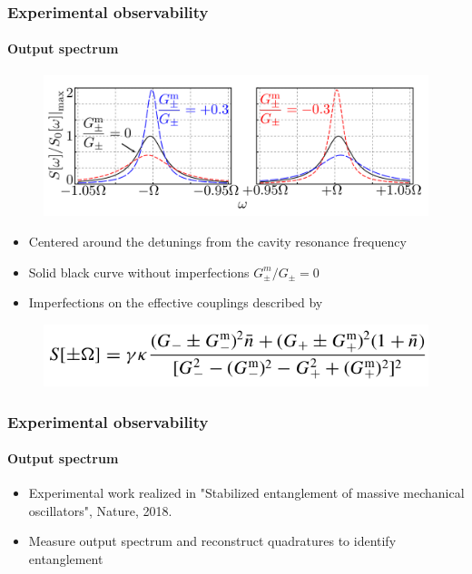 \documentclass[aspectratio=43]{beamer}
\begin{document}
\begin{frame}

\frametitle{Experimental observability}
\framesubtitle{Output spectrum}
	
	\begin{figure}
		\includegraphics[width = 9 cm]{plots/plot_spectrum.png}
	\end{figure}	

	\begin{itemize}
		\item Centered around the detunings from the cavity resonance frequency
		\item Solid black curve without imperfections $G^{m}_{\pm}/G_{\pm} = 0$
		\item Imperfections on the effective couplings described by
	\end{itemize}

	\begin{figure}
		\includegraphics[width = 7 cm]{plots/spectrum_imperfections.png}
	\end{figure}

\end{frame}

\begin{frame}
	
	\frametitle{Experimental observability}
	\framesubtitle{Output spectrum}	
	
	\begin{itemize}
		\item Experimental work realized in {\color{blue}"Stabilized entanglement of massive mechanical oscillators"}, Nature, 2018.
		\item Measure output spectrum and reconstruct quadratures to identify entanglement
	\end{itemize}

\end{frame}
\end{document}
